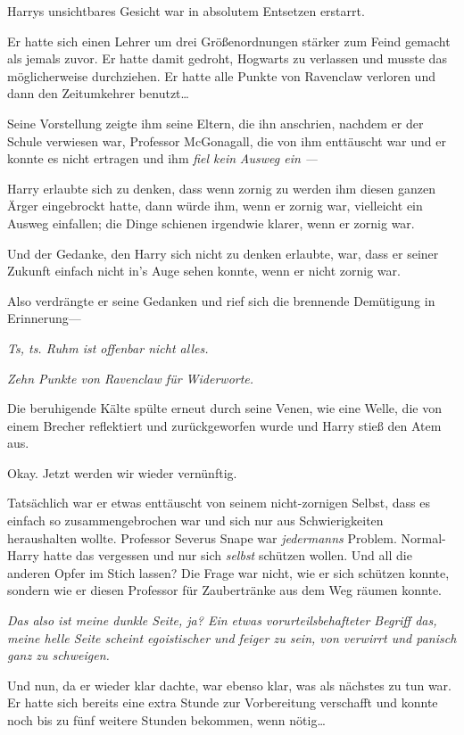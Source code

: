{Harrys unsichtbares Gesicht war in absolutem Entsetzen erstarrt.

Er hatte sich einen Lehrer um drei Größenordnungen stärker zum Feind gemacht als jemals zuvor. Er hatte damit gedroht, Hogwarts zu verlassen und musste das möglicherweise durchziehen. Er hatte alle Punkte von Ravenclaw verloren und dann den Zeitumkehrer benutzt…

Seine Vorstellung zeigte ihm seine Eltern, die ihn anschrien, nachdem er der Schule verwiesen war, Professor McGonagall, die von ihm enttäuscht war und er konnte es nicht ertragen und ihm \emph{fiel kein} \emph{Ausweg ein} \emph{—}

Harry erlaubte sich zu denken, dass wenn zornig zu werden ihm diesen ganzen Ärger eingebrockt hatte, dann würde ihm, wenn er zornig war, vielleicht ein Ausweg einfallen; die Dinge schienen irgendwie klarer, wenn er zornig war.

Und der Gedanke, den Harry sich nicht zu denken erlaubte, war, dass er seiner Zukunft einfach nicht in's Auge sehen konnte, wenn er nicht zornig war.

Also verdrängte er seine Gedanken und rief sich die brennende Demütigung in Erinnerung—

\emph{Ts, ts. Ruhm ist offenbar nicht alles.}

\emph{Zehn Punkte von Ravenclaw für Widerworte.}

Die beruhigende Kälte spülte erneut durch seine Venen, wie eine Welle, die von einem Brecher reflektiert und zurückgeworfen wurde und Harry stieß den Atem aus.

Okay. Jetzt werden wir wieder vernünftig.

Tatsächlich war er etwas enttäuscht von seinem nicht-zornigen Selbst, dass es einfach so zusammengebrochen war und sich nur aus Schwierigkeiten heraushalten wollte. Professor Severus Snape war \emph{jedermanns} Problem. Normal-Harry hatte das vergessen und nur sich \emph{selbst} schützen wollen. Und all die anderen Opfer im Stich lassen? Die Frage war nicht, wie er sich schützen konnte, sondern wie er diesen Professor für Zaubertränke aus dem Weg räumen konnte.

\emph{Das also ist meine dunkle Seite, ja? Ein etwas vorurteilsbehafteter Begriff das, meine helle Seite scheint egoistischer und feiger zu sein, von verwirrt und panisch ganz zu schweigen.}

Und nun, da er wieder klar dachte, war ebenso klar, was als nächstes zu tun war. Er hatte sich bereits eine extra Stunde zur Vorbereitung verschafft und konnte noch bis zu fünf weitere Stunden bekommen, wenn nötig…

}
